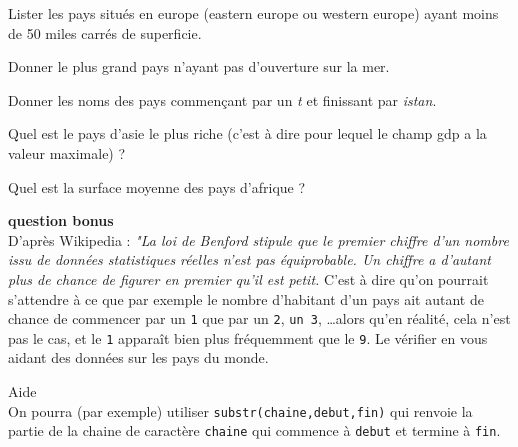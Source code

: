 \documentclass[11pt,a4paper]{article}
\begin{document}
\item Lister les pays situés en europe ({\sc eastern europe} ou {\sc western europe})  ayant moins de 50 miles carrés de superficie.
\item Donner le plus grand pays n'ayant pas d'ouverture sur la mer.
\item Donner les noms des pays commençant par un \textit{t} et finissant par \textit{istan}.
\item Quel est le pays d'asie le plus riche (c'est à dire pour lequel le champ {\sc gdp} a la valeur maximale) ?
\item Quel est la surface moyenne des pays d'afrique  ? 
\FinListe
\item \textbf{question bonus} \\
D'après Wikipedia : \textit{"La loi de Benford stipule que le premier chiffre d'un nombre issu de données statistiques réelles n'est pas équiprobable. Un chiffre a d'autant plus de chance de figurer en premier qu'il est petit.}
C'est à dire qu'on pourrait s'attendre à ce que par exemple le nombre d'habitant d'un pays ait autant de chance de commencer par un {\tt 1} que par un {\tt 2}, {\tt un 3}, \dots alors qu'en réalité, cela n'est pas le cas, et le {\tt 1} apparaît bien plus fréquemment que le {\tt 9}. Le vérifier en vous aidant des données sur les pays du monde.

\aide \; Aide \\
On pourra (par exemple) utiliser {\tt substr(chaine,debut,fin)} qui renvoie la partie de la chaine de caractère {\tt chaine} qui commence à {\tt debut} et termine à {\tt fin}. 

\FinListe
\end{document}
